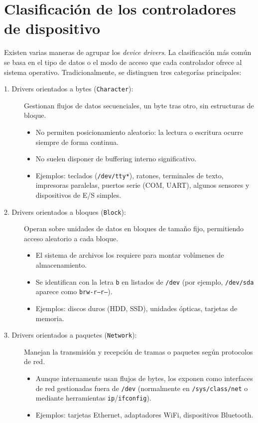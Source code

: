 \section{Clasificación de los controladores de dispositivo}

Existen varias maneras de agrupar los \emph{device drivers}. La clasificación más común se basa en el tipo de datos o el modo de acceso que cada controlador ofrece al sistema operativo. Tradicionalmente, se distinguen tres categorías principales:

\begin{description}
  \item[1. Drivers orientados a bytes (\texttt{Character}):]  
    Gestionan flujos de datos secuenciales, un byte tras otro, sin estructuras de bloque.  
    \begin{itemize}
      \item No permiten posicionamiento aleatorio: la lectura o escritura ocurre siempre de forma continua.  
      \item No suelen disponer de buffering interno significativo.  
      \item Ejemplos: teclados (\texttt{/dev/tty*}), ratones, terminales de texto, impresoras paralelas, puertos serie (COM, UART), algunos sensores y dispositivos de E/S simples.  
    \end{itemize}

  \item[2. Drivers orientados a bloques (\texttt{Block}):]  
    Operan sobre unidades de datos en bloques de tamaño fijo, permitiendo acceso aleatorio a cada bloque.  
    \begin{itemize}
      \item El sistema de archivos los requiere para montar volúmenes de almacenamiento.  
      \item Se identifican con la letra \texttt{b} en listados de \texttt{/dev} (por ejemplo, \texttt{/dev/sda} aparece como \texttt{brw-r--r--}).  
      \item Ejemplos: discos duros (HDD, SSD), unidades ópticas, tarjetas de memoria.  
    \end{itemize}

  \item[3. Drivers orientados a paquetes (\texttt{Network}):]  
    Manejan la transmisión y recepción de tramas o paquetes según protocolos de red.  
    \begin{itemize}
      \item Aunque internamente usan flujos de bytes, los exponen como interfaces de red gestionadas fuera de \texttt{/dev} (normalmente en \texttt{/sys/class/net} o mediante herramientas \texttt{ip}/\texttt{ifconfig}).  
      \item Ejemplos: tarjetas Ethernet, adaptadores WiFi, dispositivos Bluetooth.  
    \end{itemize}
\end{description}

